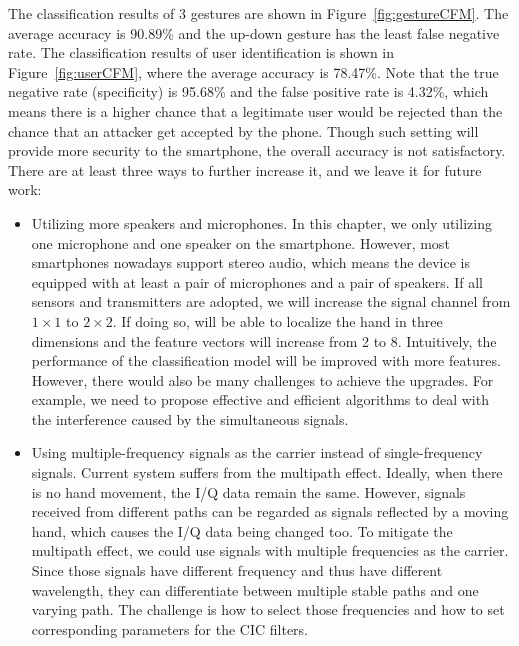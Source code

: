 The classification results of 3 gestures are shown in Figure~\ref{fig:gestureCFM}. The average accuracy is 90.89\% and the up-down gesture has the least false negative rate. The classification results of user identification is shown in Figure~\ref{fig:userCFM}, where the average accuracy is 78.47\%.  Note that the true negative rate (specificity) is 95.68\% and the false positive rate is 4.32\%, which means there is a higher chance that a legitimate user would be rejected than the chance that an attacker get accepted by the phone. Though such setting will provide more security to the smartphone, the overall accuracy is not satisfactory. There are at least three ways to further increase it, and we leave it for future work:
\begin{itemize}
	\item Utilizing more speakers and microphones. In this chapter, we only utilizing one microphone and one speaker on the smartphone. However, most smartphones nowadays support stereo audio, which means the device is equipped with at least a pair of microphones and a pair of speakers. If all sensors and transmitters are adopted, we will increase the signal channel from $1\times1$ to $2 \times2$. If doing so, {\uu} will be able to localize the hand in three dimensions and the feature vectors will increase from 2 to 8. Intuitively, the performance of the classification model will be improved with more features. However, there would also be many challenges to achieve the upgrades. For example, we need to propose effective and efficient algorithms to deal with the interference caused by the simultaneous signals.
	
	\item Using multiple-frequency signals as the carrier instead of single-frequency signals. Current {\uu} system suffers from the multipath effect. Ideally, when there is no hand movement, the I/Q data remain the same. However, signals received from different paths can be regarded as signals reflected by a moving hand, which causes the I/Q data being changed too. To mitigate the multipath effect, we could use signals with multiple frequencies as the carrier. Since those signals have different frequency and thus have different wavelength, they can differentiate between multiple stable paths and one varying path. The challenge is how to select those frequencies and how to set corresponding parameters for the CIC filters.
	

\end{itemize}

